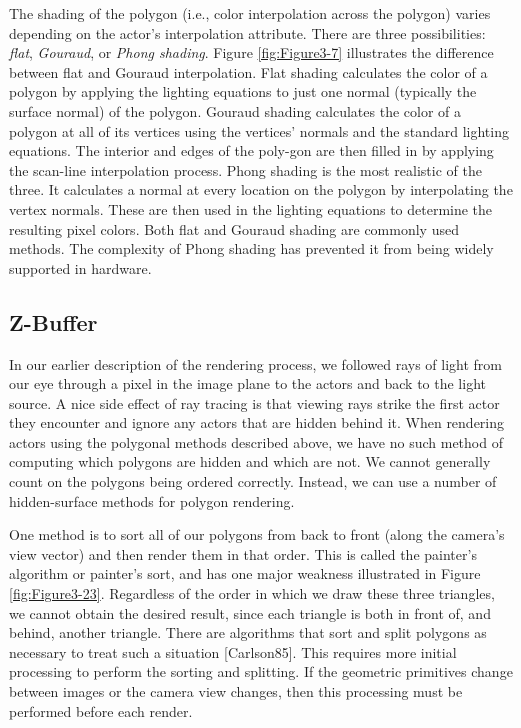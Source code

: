 The shading of the polygon (i.e., color interpolation across the polygon) varies depending on the actor's interpolation attribute. \label{subsection:rasterization.phong}
There are three possibilities: \emph{flat}, \emph{Gouraud}, or \emph{Phong shading}. Figure \ref{fig:Figure3-7} illustrates the difference between flat and Gouraud interpolation. Flat shading calculates the color of a polygon by applying the lighting equations to just one normal (typically the surface normal) of the polygon. Gouraud shading calculates the color of a polygon at all of its vertices using the vertices' normals and the standard lighting equations. The interior and edges of the poly-gon are then filled in by applying the scan-line interpolation process. Phong shading is the most realistic of the three. It calculates a normal at every location on the polygon by interpolating the vertex normals. These are then used in the lighting equations to determine the resulting pixel colors. Both flat and Gouraud shading are commonly used methods. The complexity of Phong shading has prevented it from being widely supported in hardware.

\subsection{Z-Buffer}
\label{Z-Buffer}
In our earlier description of the rendering process, we followed rays of light from our eye through a pixel in the image plane to the actors and back to the light source. A nice side effect of ray tracing is that viewing rays strike the first actor they encounter and ignore any actors that are hidden behind it. When rendering actors using the polygonal methods described above, we have no such method of computing which polygons are hidden and which are not. We cannot generally count on the polygons being ordered correctly. Instead, we can use a number of hidden-surface methods for polygon rendering.

One method is to sort all of our polygons from back to front (along the camera's view vector) and then render them in that order. This is called the painter's algorithm or painter's sort, and has one major weakness illustrated in Figure \ref{fig:Figure3-23}. Regardless of the order in which we draw these three triangles, we cannot obtain the desired result, since each triangle is both in front of, and behind, another triangle. There are algorithms that sort and split polygons as necessary to treat such a situation [Carlson85]. This requires more initial processing to perform the sorting and splitting. If the geometric primitives change between images or the camera view changes, then this processing must be performed before each render.

